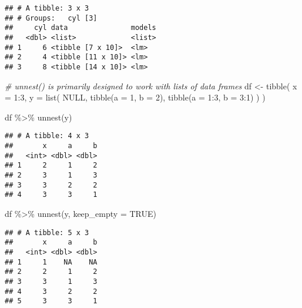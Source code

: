 \documentclass[
]{book}
\newenvironment{Shaded}{\begin{snugshade}}{\end{snugshade}}
\newcommand{\AttributeTok}[1]{\textcolor[rgb]{0.77,0.63,0.00}{#1}}
\newcommand{\CommentTok}[1]{\textcolor[rgb]{0.56,0.35,0.01}{\textit{#1}}}
\newcommand{\ConstantTok}[1]{\textcolor[rgb]{0.00,0.00,0.00}{#1}}
\newcommand{\DecValTok}[1]{\textcolor[rgb]{0.00,0.00,0.81}{#1}}
\newcommand{\FunctionTok}[1]{\textcolor[rgb]{0.00,0.00,0.00}{#1}}
\newcommand{\NormalTok}[1]{#1}
\newcommand{\OtherTok}[1]{\textcolor[rgb]{0.56,0.35,0.01}{#1}}
\newcommand{\SpecialCharTok}[1]{\textcolor[rgb]{0.00,0.00,0.00}{#1}}
\begin{document}
\begin{verbatim}
## # A tibble: 3 x 3
## # Groups:   cyl [3]
##     cyl data               models
##   <dbl> <list>             <list>
## 1     6 <tibble [7 x 10]>  <lm>  
## 2     4 <tibble [11 x 10]> <lm>  
## 3     8 <tibble [14 x 10]> <lm>
\end{verbatim}

\begin{Shaded}
\begin{Highlighting}[]
\CommentTok{\# unnest() is primarily designed to work with lists of data frames}
\NormalTok{df }\OtherTok{\textless{}{-}} \FunctionTok{tibble}\NormalTok{(}
  \AttributeTok{x =} \DecValTok{1}\SpecialCharTok{:}\DecValTok{3}\NormalTok{,}
  \AttributeTok{y =} \FunctionTok{list}\NormalTok{(}
    \ConstantTok{NULL}\NormalTok{,}
    \FunctionTok{tibble}\NormalTok{(}\AttributeTok{a =} \DecValTok{1}\NormalTok{, }\AttributeTok{b =} \DecValTok{2}\NormalTok{),}
    \FunctionTok{tibble}\NormalTok{(}\AttributeTok{a =} \DecValTok{1}\SpecialCharTok{:}\DecValTok{3}\NormalTok{, }\AttributeTok{b =} \DecValTok{3}\SpecialCharTok{:}\DecValTok{1}\NormalTok{)}
\NormalTok{  )}
\NormalTok{)}

\NormalTok{df }\SpecialCharTok{\%\textgreater{}\%} 
  \FunctionTok{unnest}\NormalTok{(y)}
\end{Highlighting}
\end{Shaded}

\begin{verbatim}
## # A tibble: 4 x 3
##       x     a     b
##   <int> <dbl> <dbl>
## 1     2     1     2
## 2     3     1     3
## 3     3     2     2
## 4     3     3     1
\end{verbatim}

\begin{Shaded}
\begin{Highlighting}[]
\NormalTok{df }\SpecialCharTok{\%\textgreater{}\%} 
  \FunctionTok{unnest}\NormalTok{(y, }\AttributeTok{keep\_empty =} \ConstantTok{TRUE}\NormalTok{)}
\end{Highlighting}
\end{Shaded}

\begin{verbatim}
## # A tibble: 5 x 3
##       x     a     b
##   <int> <dbl> <dbl>
## 1     1    NA    NA
## 2     2     1     2
## 3     3     1     3
## 4     3     2     2
## 5     3     3     1
\end{verbatim}
\end{document}
